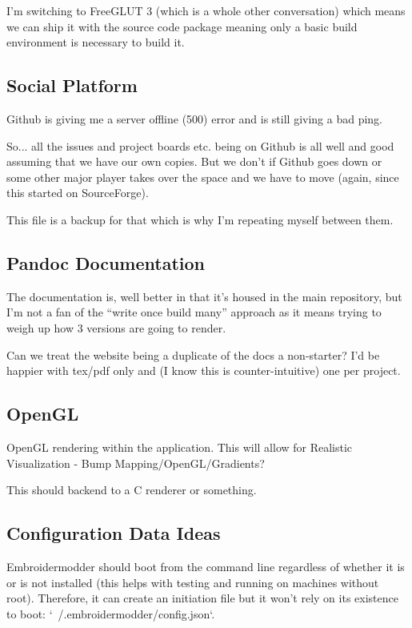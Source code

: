 \documentclass{report}
\begin{document}
I'm switching to FreeGLUT 3 (which is a whole other conversation) which means we
can ship it with the source code package meaning only a basic build
environment is necessary to build it.

\subsection{Social Platform}

Github is giving me a server offline (500) error and is still giving a bad ping.

So... all the issues and project boards etc. being on Github is all well and good assuming that we have our own copies. But we don't if Github goes down or some other major player takes over the space and we have to move (again, since this started on SourceForge).

This file is a backup for that which is why I'm repeating myself between them.

\subsection{Pandoc Documentation}

The documentation is, well better in that it's housed in the main repository,
but I'm not a fan of the ``write once build many'' approach as it means
trying to weigh up how 3 versions are going to render.

Can we treat the website being a duplicate of the docs a non-starter?
I'd be happier with tex/pdf only and (I know this is counter-intuitive) one
per project.

\subsection{OpenGL}

OpenGL rendering within the application. This will allow for
Realistic Visualization - Bump Mapping/OpenGL/Gradients?

This should backend to a C renderer or something.

\subsection{Configuration Data Ideas}

Embroidermodder should boot from the command line
regardless of whether it is or is not installed (this helps with testing and
running on machines without root). Therefore, it can create an initiation file
but it won't rely on its existence to boot: `~/.embroidermodder/config.json`.
\end{document}
